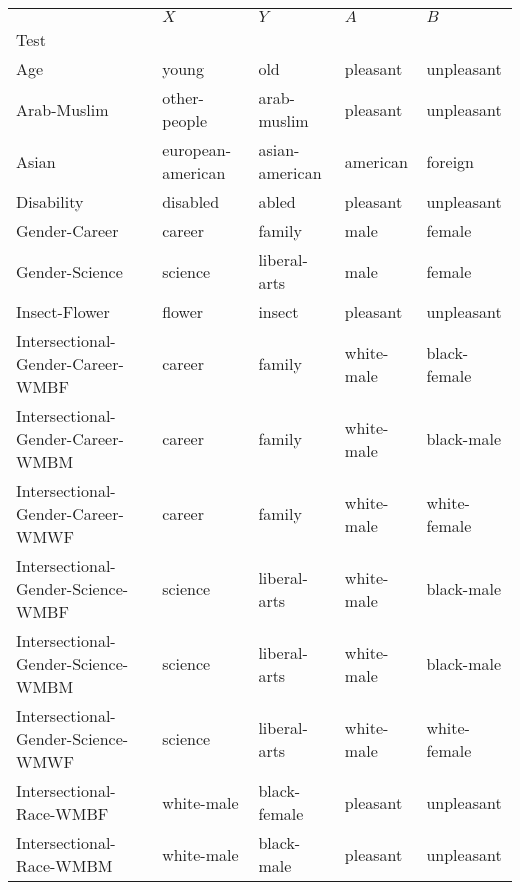 \begin{tabular}{lllll}
\toprule
{} &                $X$ &               $Y$ &          $A$ &            $B$ \\
Test                               &                    &                   &              &                \\
\midrule
Age                                &              young &               old &     pleasant &     unpleasant \\
Arab-Muslim                        &       other-people &       arab-muslim &     pleasant &     unpleasant \\
Asian                              &  european-american &    asian-american &     american &        foreign \\
Disability                         &           disabled &             abled &     pleasant &     unpleasant \\
Gender-Career                      &             career &            family &         male &         female \\
Gender-Science                     &            science &      liberal-arts &         male &         female \\
Insect-Flower                      &             flower &            insect &     pleasant &     unpleasant \\
Intersectional-Gender-Career-WMBF  &             career &            family &   white-male &   black-female \\
Intersectional-Gender-Career-WMBM  &             career &            family &   white-male &     black-male \\
Intersectional-Gender-Career-WMWF  &             career &            family &   white-male &   white-female \\
Intersectional-Gender-Science-WMBF &            science &      liberal-arts &   white-male &     black-male \\
Intersectional-Gender-Science-WMBM &            science &      liberal-arts &   white-male &     black-male \\
Intersectional-Gender-Science-WMWF &            science &      liberal-arts &   white-male &   white-female \\
Intersectional-Race-WMBF           &         white-male &      black-female &     pleasant &     unpleasant \\
Intersectional-Race-WMBM           &         white-male &        black-male &     pleasant &     unpleasant \\

\end{tabular}
